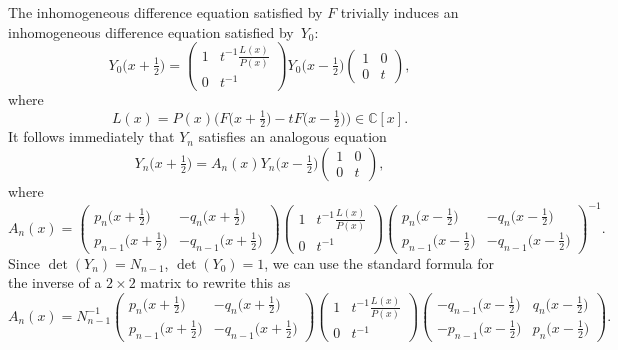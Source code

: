\documentclass[pdftex]{sigma}
\newcommand{\CN}{\mathbb{C}} %
\theoremstyle{definition}
\numberwithin{equation}{section}
\begin{document}
The inhomogeneous difference equation satisfied by $F$ trivially induces an
inhomogeneous difference equation satisfied by~$Y_0$:
\[
Y_0\big(x+\tfrac{1}{2}\big)
=
\begin{pmatrix}
 1 & t^{-1}\frac{L(x)}{P(x)}\\[1ex]
 0 & t^{-1}
\end{pmatrix}
Y_0\big(x-\tfrac{1}{2}\big)
\begin{pmatrix}
 1 & 0\\
 0 & t
\end{pmatrix} ,
\]
where
\[
L(x) = P(x)\big(F\big(x+\tfrac{1}{2}\big)-tF\big(x-\tfrac{1}{2}\big)\big)\in \CN[x].
\]
It follows immediately that $Y_n$ satisfies an analogous equation
\[
Y_n\big(x+\tfrac{1}{2}\big)=A_n(x)Y_n\big(x-\tfrac{1}{2}\big)
\begin{pmatrix}
 1 & 0\\
 0 & t
\end{pmatrix} ,
\]
where
\[
A_n(x)=
\begin{pmatrix} p_n\big(x+\frac{1}{2}\big) & -q_n\big(x+\frac{1}{2}\big)\\[1ex]
 p_{n-1}\big(x+\frac{1}{2}\big) & -q_{n-1}\big(x+\frac{1}{2}\big)\end{pmatrix}
\begin{pmatrix}
 1 & t^{-1}\frac{L(x)}{P(x)}\\[1ex]
 0 & t^{-1}
\end{pmatrix}
\begin{pmatrix} p_n\big(x-\tfrac{1}{2}\big) & -q_n\big(x-\tfrac{1}{2}\big)\\[1ex]
 p_{n-1}\big(x-\tfrac{1}{2}\big) & -q_{n-1}\big(x-\tfrac{1}{2}\big)\end{pmatrix}^{-1}.
\]
Since $\det(Y_n)=N_{n-1}$, $\det(Y_0)=1$, we can use the standard formula
for the inverse of a $2\times 2$ matrix to rewrite this as
\[
A_n(x)
=
N_{n-1}^{-1}
\begin{pmatrix} p_n\big(x+\frac{1}{2}\big) & -q_n\big(x+\frac{1}{2}\big)\\[1ex]
 p_{n-1}\big(x+\frac{1}{2}\big) & -q_{n-1}\big(x+\frac{1}{2}\big)\end{pmatrix}
\begin{pmatrix}
 1 & t^{-1}\frac{L(x)}{P(x)}\\[1ex]
 0 & t^{-1}
\end{pmatrix}
\begin{pmatrix} -q_{n-1}\big(x-\tfrac{1}{2}\big) & q_n\big(x-\tfrac{1}{2}\big)\\[1ex]
 -p_{n-1}\big(x-\tfrac{1}{2}\big) & p_n\big(x-\tfrac{1}{2}\big)\end{pmatrix} .
\]
\end{document}
